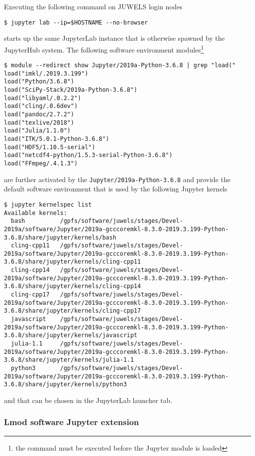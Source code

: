\documentclass[11pt,a4paper]{article}
\begin{document}
Executing the following command on JUWELS login nodes
%
\begin{verbatim}
$ jupyter lab --ip=$HOSTNAME --no-browser
\end{verbatim}
%
starts up the same JupyterLab instance that is otherwise spawned by the JupyterHub system.
The following software environment modules\footnote{the command must be executed before the Jupyter module is loaded}

\begin{verbatim}
$ module --redirect show Jupyter/2019a-Python-3.6.8 | grep "load("
load("imkl/.2019.3.199")
load("Python/3.6.8")
load("SciPy-Stack/2019a-Python-3.6.8")
load("libyaml/.0.2.2")
load("cling/.0.6dev")
load("pandoc/2.7.2")
load("texlive/2018")
load("Julia/1.1.0")
load("ITK/5.0.1-Python-3.6.8")
load("HDF5/1.10.5-serial")
load("netcdf4-python/1.5.3-serial-Python-3.6.8")
load("FFmpeg/.4.1.3")
\end{verbatim}
%
are further activated by the \verb|Jupyter/2019a-Python-3.6.8| and provide the default software environment that is used by the following Jupyter kernels
%
\begin{verbatim}
$ jupyter kernelspec list
Available kernels:
  bash          /gpfs/software/juwels/stages/Devel-2019a/software/Jupyter/2019a-gcccoremkl-8.3.0-2019.3.199-Python-3.6.8/share/jupyter/kernels/bash
  cling-cpp11   /gpfs/software/juwels/stages/Devel-2019a/software/Jupyter/2019a-gcccoremkl-8.3.0-2019.3.199-Python-3.6.8/share/jupyter/kernels/cling-cpp11
  cling-cpp14   /gpfs/software/juwels/stages/Devel-2019a/software/Jupyter/2019a-gcccoremkl-8.3.0-2019.3.199-Python-3.6.8/share/jupyter/kernels/cling-cpp14
  cling-cpp17   /gpfs/software/juwels/stages/Devel-2019a/software/Jupyter/2019a-gcccoremkl-8.3.0-2019.3.199-Python-3.6.8/share/jupyter/kernels/cling-cpp17
  javascript    /gpfs/software/juwels/stages/Devel-2019a/software/Jupyter/2019a-gcccoremkl-8.3.0-2019.3.199-Python-3.6.8/share/jupyter/kernels/javascript
  julia-1.1     /gpfs/software/juwels/stages/Devel-2019a/software/Jupyter/2019a-gcccoremkl-8.3.0-2019.3.199-Python-3.6.8/share/jupyter/kernels/julia-1.1
  python3       /gpfs/software/juwels/stages/Devel-2019a/software/Jupyter/2019a-gcccoremkl-8.3.0-2019.3.199-Python-3.6.8/share/jupyter/kernels/python3
\end{verbatim}
%
and that can be chosen in the JupyterLab launcher tab.

\subsubsection{Lmod software Jupyter extension}
\end{document}
